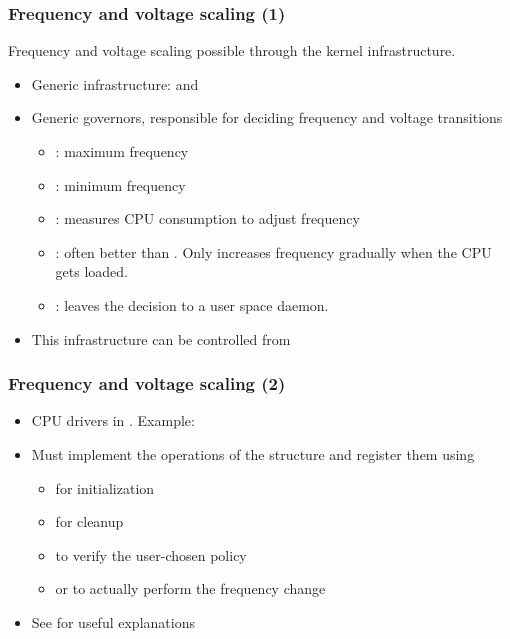 \begin{frame}
  \frametitle{Frequency and voltage scaling (1)}
  Frequency and voltage scaling possible through the
   kernel infrastructure.
  \begin{itemize}
  \item Generic infrastructure:  and
  \item Generic governors, responsible for deciding frequency and
    voltage transitions
    \begin{itemize}
    \item {}: maximum frequency
    \item {}: minimum frequency
    \item {}: measures CPU consumption to adjust frequency
    \item {}: often better than
      . Only increases frequency gradually when the
      CPU gets loaded.
    \item {}: leaves the decision to a user space
      daemon.
    \end{itemize}
  \item This infrastructure can be controlled from
  \end{itemize}
\end{frame}

\begin{frame}
  \frametitle{Frequency and voltage scaling (2)}
  \begin{itemize}
  \item CPU drivers in .  Example:
  \item Must implement the operations of the 
    structure and register them using 
    \begin{itemize}
    \item {} for initialization
    \item {} for cleanup
    \item {} to verify the user-chosen policy
    \item {} or  to actually perform
      the frequency change
    \end{itemize}
  \item See  for useful explanations
  \end{itemize}
\end{frame}

